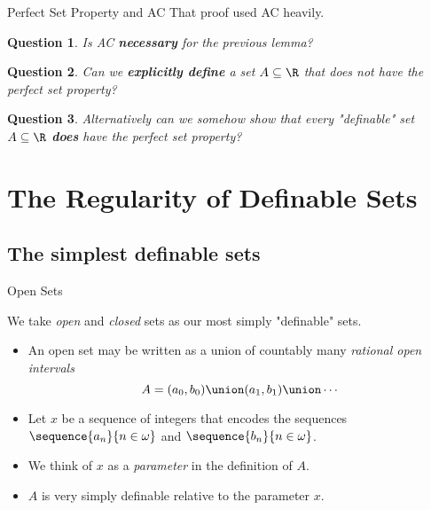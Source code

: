 \documentclass{beamer}
\newtheorem*{question}{Question}
\begin{document}
\begin{frame}{Perfect Set Property and AC}
That proof used AC heavily.

\begin{question}
Is AC \textbf{necessary} for the previous lemma?
\end{question}

\begin{question}
Can we \textbf{explicitly define} a set $A\subseteq \R$ that does not have the perfect set property?
\end{question}

\begin{question}
 Alternatively can we somehow show that every "definable" set
$A\subseteq \R$ \textbf{does} have the perfect set property?
\end{question}

\end{frame}

\section{The Regularity of Definable Sets}

\subsection{The simplest definable sets}

\begin{frame}{Open Sets}

We take \emph{open} and \emph{closed} sets as our most simply "definable" sets.

\pause

\begin{itemize}
  \item An open set may be written as a union of countably many
  \emph{rational open intervals}
  $$A = (a_0, b_0) \union (a_1, b_1) \union \cdots$$
  \item Let $x$ be a sequence of integers that encodes the sequences
  $\sequence{a_n}{n\in\omega}$ and $\sequence{b_n}{n\in\omega}$.
  \item We think of $x$ as a \emph{parameter} in the definition
  of $A$.
  \item $A$ is very simply definable relative to the parameter $x$.
\end{itemize}

\end{frame}
\end{document}
